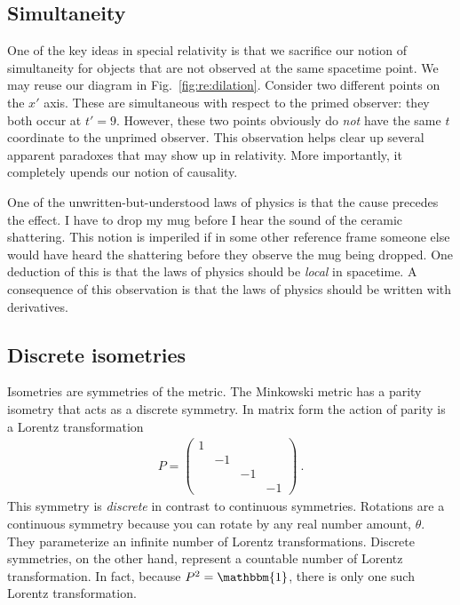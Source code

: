 \begin{subappendices}
\subsection{%
Simultaneity}
\label{eq:simultaneity}

One of the key ideas in special relativity is that we sacrifice our notion of simultaneity for objects that are not observed at the same spacetime point. We may reuse our diagram in Fig.~\ref{fig:re:dilation}. Consider two different points on the $x'$ axis. These are simultaneous with respect to the primed observer: they both occur at $t'=9$. However, these two points  obviously do \emph{not} have the same $t$ coordinate to the unprimed observer. This observation helps clear up several apparent paradoxes that may show up in relativity. More importantly, it completely upends our notion of causality.

One of the unwritten-but-understood laws of physics is that the cause precedes the effect. I have to drop my mug before I hear the sound of the ceramic shattering. This notion is imperiled if in some other reference frame someone else would have heard the shattering before they observe the mug being dropped. One deduction of this is that the laws of physics should be \emph{local} in spacetime. A consequence of this observation is that the laws of physics should be written with derivatives.


\subsection{%
Discrete isometries}

Isometries are symmetries of the metric.
% 
The Minkowski metric has a parity isometry that acts as a discrete symmetry. In matrix form the action of parity is a Lorentz transformation
\begin{align}
    P = \begin{pmatrix}
        1 & & &\\
         & -1& &\\
         & & -1 &\\
         & & & -1
    \end{pmatrix}\ .
\end{align}
This symmetry is \emph{discrete} in contrast to continuous symmetries. Rotations are a continuous symmetry because you can rotate by any real number amount, $\theta$. They parameterize an infinite number of Lorentz transformations. Discrete symmetries, on the other hand, represent a countable number of Lorentz transformation. In fact, because $P^2 = \mathbbm{1}$, there is only one such Lorentz transformation. 


\end{subappendices}
